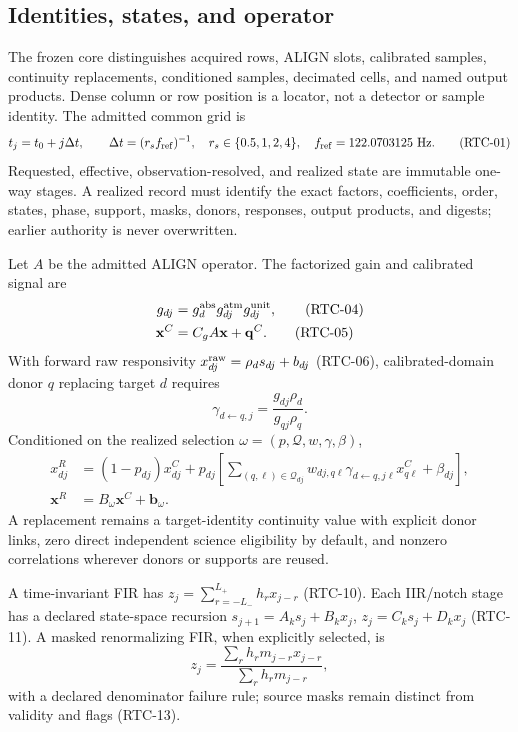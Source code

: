 \documentclass[11pt]{article}
\begin{document}
\subsection{Identities, states, and operator}

The frozen core distinguishes acquired rows, ALIGN slots, calibrated samples,
continuity replacements, conditioned samples, decimated cells, and named
output products.  Dense column or row position is a locator, not a detector or
sample identity.  The admitted common grid is
\begin{equation}
t_j=t_0+j\Delta t,\qquad \Delta t=(r_s f_{\rm ref})^{-1},
\quad r_s\in\{0.5,1,2,4\},\quad f_{\rm ref}=122.0703125\ {\rm Hz}.
\tag{RTC-01}
\end{equation}
Requested, effective, observation-resolved, and realized state are immutable
one-way stages.  A realized record must identify the exact factors,
coefficients, order, states, phase, support, masks, donors, responses, output
products, and digests; earlier authority is never overwritten.

Let $A$ be the admitted ALIGN operator.  The factorized gain and calibrated
signal are
\begin{align}
g_{dj}&=g^{\rm abs}_{d}g^{\rm atm}_{dj}g^{\rm unit}_{dj},
\tag{RTC-04}\\
\mathbf x^C&=C_g A\mathbf x+\mathbf q^C.
\tag{RTC-05}
\end{align}
With forward raw responsivity $x^{\rm raw}_{dj}=\rho_d s_{dj}+b_{dj}$
(RTC-06), calibrated-domain donor $q$ replacing target $d$ requires
\begin{equation}
\gamma_{d\leftarrow q,j}=\frac{g_{dj}\rho_d}{g_{qj}\rho_q}.
\tag{RTC-07}
\end{equation}
Conditioned on the realized selection $\omega=(p,\mathcal Q,w,\gamma,\beta)$,
\begin{align}
x^R_{dj}&=(1-p_{dj})x^C_{dj}+p_{dj}\left[
 \sum_{(q,\ell)\in\mathcal Q_{dj}}w_{dj,q\ell}
 \gamma_{d\leftarrow q,j\ell}x^C_{q\ell}+\beta_{dj}\right],
\tag{RTC-08}\\
\mathbf x^R&=B_\omega\mathbf x^C+\mathbf b_\omega.
\tag{RTC-09}
\end{align}
A replacement remains a target-identity continuity value with explicit donor
links, zero direct independent science eligibility by default, and nonzero
correlations wherever donors or supports are reused.

A time-invariant FIR has $z_j=\sum_{r=-L_-}^{L_+}h_r x_{j-r}$ (RTC-10).
Each IIR/notch stage has a declared state-space recursion
$s_{j+1}=A_ks_j+B_kx_j$, $z_j=C_ks_j+D_kx_j$ (RTC-11).  A masked
renormalizing FIR, when explicitly selected, is
\begin{equation}
z_j=\frac{\sum_r h_r m_{j-r}x_{j-r}}
          {\sum_r h_r m_{j-r}},
\tag{RTC-12}
\end{equation}
with a declared denominator failure rule; source masks remain distinct from
validity and flags (RTC-13).
\end{document}
